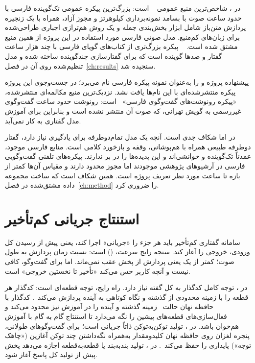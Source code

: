 در ، شاخص‌ترین منبع عمومی
~\cite{qharabagh2025manatts} است: بزرگ‌ترین پیکره عمومی
تک‌گوینده فارسی با حدود  ساعت صوت با بسامد نمونه‌برداری
 کیلوهرتز و مجوز آزاد، همراه با یک زنجیره پردازش متن‌باز شامل
ابزار بخش‌بندی جمله و یک روش هم‌ترازی اجباری طراحی‌شده برای زبان‌های
کم‌منبع. مدل صوتی فارسی مورد استفاده در این پروژه از همین منبع مشتق شده
است. ~\cite{ranjbar2025parsvoice} پیکره بزرگ‌تری از کتاب‌های
گویای فارسی با چند هزار ساعت گفتار و صدها گوینده است که برای گفتارسازی
چندگوینده ساخته شده و مدل  تنظیم‌شده روی آن در
فصل~\ref{ch:results} سنجیده شد.

پیشنهاده پروژه  و  را به‌عنوان نمونه پیکره
فارسی نام می‌برد؛ در جست‌وجوی این پروژه پیکره منتشرشده‌ای با این نام‌ها یافت
نشد. نزدیک‌ترین منبع مکالمه‌ای منتشرشده، «پیکره رونوشت‌های گفت‌وگوی
فارسی»~\cite{mohammadi2019ccpt} است: رونوشت حدود  ساعت گفت‌وگوی
غیررسمی به گویش تهرانی، که صوت آن منتشر نشده است و بنابراین برای آموزش
مدل گفتاری به کار نمی‌آید.

در  اما شکاف جدی است. آنچه یک مدل
تمام‌دوطرفه برای یادگیری نیاز دارد، گفتار دو‌طرفه طبیعی همراه با
هم‌پوشانی، وقفه و بازخورد کلامی است. منابع فارسی موجود، عمدتاً تک‌گوینده و
خوانشی‌اند و این پدیده‌ها را در بر ندارند. پیکره‌های تلفنی گفت‌وگویی فارسی
در آرشیوهای پژوهشی موجودند اما مجوز محدود دارند و مقیاس آن‌ها کمتر از بازه
 تا  ساعت مورد نظر تعریف پروژه است. همین شکاف است که ساخت
مجموعه داده مشتق‌شده در فصل~\ref{ch:method} را ضروری کرد.

\section{استنتاج جریانی کم‌تأخیر}
\label{sec:streaming-lit}

سامانه گفتاری کم‌تأخیر باید هر جزء را «جریانی» اجرا کند، یعنی پیش از رسیدن
کل ورودی، خروجی را آغاز کند. سنجه رایج سرعت، 
() است: نسبت زمان پردازش به طول صوت؛  کمتر از یک یعنی
پردازش از پخش عقب نمی‌ماند. اما برای گفت‌وگو،  کافی نیست و آنچه کاربر
حس می‌کند «تأخیر تا نخستین خروجی» است.

در ، توجه کامل کدگذار به کل گفته نیاز دارد. راه رایج،
توجه قطعه‌ای است: کدگذار هر قطعه را با زمینه محدودی از گذشته و نگاه کوتاهی به
آینده پردازش می‌کند~\cite{chen2021streamingtt}. کدگذار  با
حافظه نهان حالت~\cite{noroozi2023cacheaware} زمینه گذشته و آینده را در آموزش
نیز محدود می‌کند و فعال‌سازی‌های قطعه‌های پیشین را نگه می‌دارد تا استنتاج گام
به گام با آموزش هم‌خوان باشد. در ، تولید توکن‌به‌توکن ذاتاً
جریانی است؛ برای گفت‌وگوهای طولانی، پنجره لغزان روی حافظه نهان کلید‌و‌مقدار
به‌همراه نگه‌داشتن چند توکن آغازین («چاهک توجه») پایداری را
حفظ می‌کند~\cite{xiao2024streamingllm}. در ، تولید
بند‌به‌بند یا قطعه‌به‌قطعه اجازه می‌دهد پخش پیش از تولید کل پاسخ آغاز شود.

